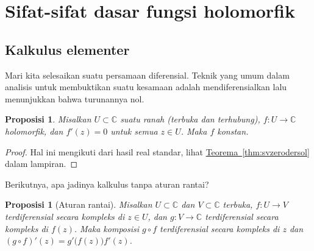 \documentclass[12pt,openany]{book}
\newcommand{\C}{{\mathbb{C}}}
\theoremstyle{plain}
\newtheorem{prop}[thm]{Proposisi}
\theoremstyle{remark}
\theoremstyle{definition}
\theoremstyle{exercise}
\theoremstyle{example}
\newcommand{\thmref}[1]{\hyperref[#1]{Teorema~\ref*{#1}}}
\begin{document}

\section{Sifat-sifat dasar fungsi holomorfik}

\subsection{Kalkulus elementer}

Mari kita selesaikan suatu persamaan diferensial.  Teknik yang umum dalam analisis
untuk membuktikan suatu kesamaan adalah mendiferensialkan lalu menunjukkan bahwa turunannya
nol.

\begin{prop} \label{prop:zeroder}
Misalkan $U \subset \C$ suatu ranah (terbuka dan terhubung),
$f \colon U \to \C$ holomorfik, dan $f'(z) = 0$ untuk semua $z \in U$.
Maka $f$ konstan.
\end{prop}

\begin{proof}
Hal ini mengikuti dari hasil real standar,
lihat \thmref{thm:svzerodersol} dalam lampiran.
\end{proof}

Berikutnya, apa jadinya kalkulus tanpa aturan rantai?

\begin{prop}[Aturan rantai] 
Misalkan $U \subset \C$ dan $V \subset \C$ terbuka, $f \colon U \to V$
terdiferensial secara kompleks di $z \in U$, dan $g \colon V \to \C$ terdiferensial secara kompleks
di $f(z)$.  Maka komposisi $g \circ f$
terdiferensial secara kompleks di $z$ dan $(g \circ f)'(z) = g'\bigl(f(z)\bigr) f'(z)$.
\end{prop}
\end{document}

